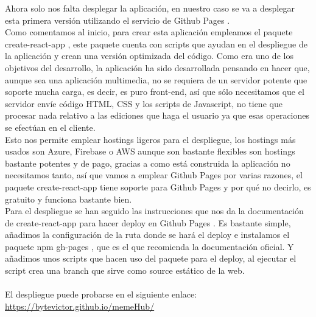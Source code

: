 Ahora solo nos falta desplegar la aplicación, en nuestro caso se va a desplegar esta primera 
versión utilizando el servicio de Github Pages \cite{GithubPages}.
\\
Como comentamos al inicio, para crear esta aplicación empleamos el paquete create-react-app \cite{create-react-app},
este paquete cuenta con scripts que ayudan en el despliegue de la aplicación y crean una 
versión optimizada del código.
Como era uno de los objetivos del desarrollo, la aplicación ha sido desarrollada pensando
en hacer que, aunque sea una aplicación multimedia, no se requiera de un servidor potente que
soporte mucha carga, es decir, es puro front-end, así que sólo necesitamos que el servidor
envíe código HTML, CSS y los scripts de Javascript, no tiene que procesar nada relativo a las
ediciones que haga el usuario ya que esas operaciones se efectúan en el cliente.
\\
Esto nos permite emplear hostings ligeros para el despliegue, 
los hostings más usados son Azure, Firebase o AWS aunque son bastante flexibles son hostings 
bastante potentes y de pago, gracias a como está construida la aplicación no necesitamos tanto,
así que vamos a emplear Github Pages por varias razones, el paquete 
create-react-app \cite{create-react-app} tiene soporte para Github Pages \cite{GithubPages}
y por qué no decirlo, es gratuito y funciona bastante bien.
\\
Para el despliegue se han seguido las instrucciones que nos da la documentación de 
create-react-app para hacer deploy en Github Pages \cite{GithubPagesDeploy}.
Es bastante simple, añadimos la configuración de la ruta donde se hará el deploy e instalamos
el paquete npm gh-pages \cite{gh-pages}, que es el que recomienda la documentación oficial.
Y añadimos unos scripts que hacen uso del paquete para el deploy, al ejecutar el script
crea una branch que sirve como source estático de la web.
\\\\
El despliegue puede probarse en el siguiente enlace: \url{https://bytevictor.github.io/memeHub/}